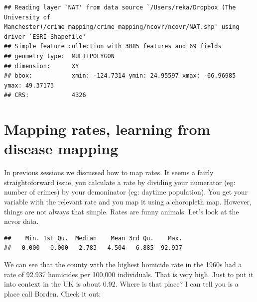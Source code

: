 \documentclass[]{book}
\newenvironment{Shaded}{\begin{snugshade}}{\end{snugshade}}
\newcommand{\KeywordTok}[1]{\textcolor[rgb]{0.13,0.29,0.53}{\textbf{#1}}}
\newcommand{\NormalTok}[1]{#1}
\newcommand{\OperatorTok}[1]{\textcolor[rgb]{0.81,0.36,0.00}{\textbf{#1}}}
\newcommand{\StringTok}[1]{\textcolor[rgb]{0.31,0.60,0.02}{#1}}
\begin{document}
\begin{verbatim}
## Reading layer `NAT' from data source `/Users/reka/Dropbox (The University of Manchester)/crime_mapping/crime_mapping/ncovr/ncovr/NAT.shp' using driver `ESRI Shapefile'
## Simple feature collection with 3085 features and 69 fields
## geometry type:  MULTIPOLYGON
## dimension:      XY
## bbox:           xmin: -124.7314 ymin: 24.95597 xmax: -66.96985 ymax: 49.37173
## CRS:            4326
\end{verbatim}

\hypertarget{mapping-rates-learning-from-disease-mapping}{%
\section{Mapping rates, learning from disease mapping}\label{mapping-rates-learning-from-disease-mapping}}

In previous sessions we discussed how to map rates. It seems a fairly straightoforward issue, you calculate a rate by dividing your numerator (eg: number of crimes) by your demoninator (eg: daytime population). You get your variable with the relevant rate and you map it using a choropleth map. However, things are not always that simple. Rates are funny animals. Let's look at the ncvor data.

\begin{Shaded}
\end{Shaded}

\begin{verbatim}
##    Min. 1st Qu.  Median    Mean 3rd Qu.    Max. 
##   0.000   0.000   2.783   4.504   6.885  92.937
\end{verbatim}

We can see that the county with the highest homicide rate in the 1960s had a rate of 92.937 homicides per 100,000 individuals. That is very high. Just to put it into context in the UK is about 0.92. Where is that place? I can tell you is a place call Borden. Check it out:

\begin{Shaded}
\end{Shaded}
\end{document}
